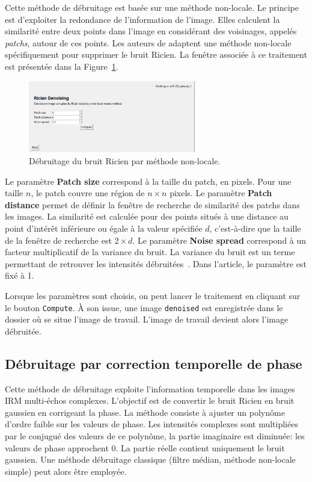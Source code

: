 \documentclass[french]{article}
\begin{document}
Cette méthode de débruitage est basée sur une méthode non-locale. Le
principe est d'exploiter la redondance de l'information de l'image.
Elles calculent la similarité entre deux points dans l'image en
considérant des voisinages, appelés \textit{patchs}, autour de ces
points. Les auteurs de \cite{Wiest08} adaptent une méthode non-locale
spécifiquement pour supprimer le bruit Ricien. La fenêtre associée à
ce traitement est présentée dans la
Figure~\ref{fig:denoising_nlmeans}.

\begin{figure}[ht]
  \centering
  \includegraphics[width=0.65\textwidth]{fig/denoising_nlmeans}
  \caption{Débruitage du bruit Ricien par méthode non-locale.}
  \label{fig:denoising_nlmeans}
\end{figure}

Le paramètre \textbf{Patch size} correspond à la taille du patch, en
pixels. Pour une taille $n$, le patch couvre une région de $n \times n$
pixels. Le paramètre \textbf{Patch distance} permet de définir la
fenêtre de recherche de similarité des patchs dans les images. La
similarité est calculée pour des points situés à une distance au point
d'intérêt inférieure ou égale à la valeur spécifiée $d$, c'est-à-dire
que la taille de la fenêtre de recherche est $2 \times d$. Le paramètre
\textbf{Noise spread} correspond à un facteur multiplicatif de la
variance du bruit. La variance du bruit est un terme permettant de
retrouver les intensités débruitées~\cite{Wiest08}. Dans
l'article, le paramètre est fixé à 1.

Lorsque les paramètres sont choisis, on peut lancer le traitement en
cliquant sur le bouton \texttt{Compute}. À son issue, une image
\texttt{denoised} est enregistrée dans le dossier où se situe l'image de
travail. L'image de travail devient alors l'image débruitée.


\subsection{Débruitage par correction temporelle de phase}
\label{sec:debr-par-corr}
Cette méthode de débruitage exploite l'information temporelle dans les
images IRM multi-échos complexes. L'objectif est de convertir le bruit
Ricien en bruit gaussien en corrigeant la phase. La méthode consiste à
ajuster un polynôme d'ordre faible sur les valeurs de phase. Les
intensités complexes sont multipliées par le conjugué des valeurs de
ce polynôme, la partie imaginaire est diminuée: les valeurs de phase
approchent 0. La partie réelle contient uniquement le bruit gaussien.
Une méthode débruitage classique (filtre médian, méthode non-locale
simple) peut alors être employée.
\end{document}
